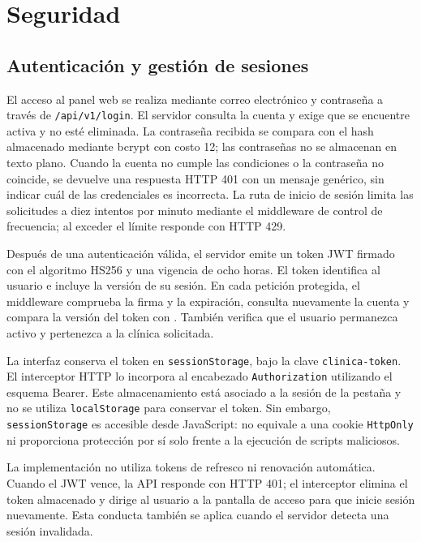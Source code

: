\section{Seguridad}


\subsection{Autenticación y gestión de sesiones}

El acceso al panel web se realiza mediante correo electrónico y contraseña
a través de \texttt{/api/v1/login}. El servidor consulta la cuenta y exige que
se encuentre activa y no esté eliminada. La contraseña recibida se compara
con el hash almacenado mediante bcrypt con costo 12; las contraseñas no se almacenan en
texto plano. Cuando la cuenta no cumple las condiciones o la contraseña no
coincide, se devuelve una respuesta HTTP 401 con un mensaje genérico, sin
indicar cuál de las credenciales es incorrecta. La ruta de inicio de sesión
limita las solicitudes a diez intentos por minuto mediante el middleware
de control de frecuencia; al exceder el límite responde con HTTP 429.

Después de una autenticación válida, el servidor emite un token JWT firmado
con el algoritmo HS256 y una vigencia de ocho horas. El token identifica al
usuario e incluye la versión de su sesión. En cada petición protegida, el
middleware comprueba la firma y la expiración, consulta nuevamente la cuenta
y compara la versión del token con . También verifica
que el usuario permanezca activo y pertenezca a la clínica solicitada.

La interfaz conserva el token en \texttt{sessionStorage}, bajo la clave
\texttt{clinica-token}. El interceptor HTTP lo incorpora al encabezado
\texttt{Authorization} utilizando el esquema Bearer. Este almacenamiento
está asociado a la sesión de la pestaña y no se utiliza
\texttt{localStorage} para conservar el token. Sin embargo,
\texttt{sessionStorage} es accesible desde JavaScript: no equivale a una
cookie \texttt{HttpOnly} ni proporciona protección por sí solo frente a
la ejecución de scripts maliciosos.

La implementación no utiliza tokens de refresco ni renovación automática.
Cuando el JWT vence, la API responde con HTTP 401; el interceptor elimina
el token almacenado y dirige al usuario a la pantalla de acceso para que
inicie sesión nuevamente. Esta conducta también se aplica cuando el
servidor detecta una sesión invalidada.

